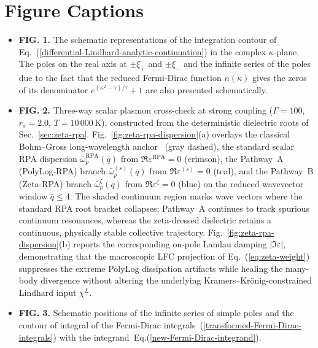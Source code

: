 \documentclass[aps,showkeys,noshowpacs,superscriptaddress,pre,preprint]{revtex4-2}
\begin{document}
\clearpage
\section*{Figure Captions}
\begin{itemize}
    \item \textbf{FIG. 1.} The schematic representations of
    the integration contour of Eq.~(\ref{differential-Lindhard-analytic-continuation})
    in the complex $\kappa$-plane.
    The poles on the real axis at $\pm \xi_{+}$ and $\pm \xi_{-}$
    and the infinite series of the poles due to the fact that
    the reduced Fermi-Dirac function ${n ( \kappa )} $
    gives the zeros of its denominator $e^{\left( \kappa^2 - \gamma \right) / \tau} + 1$
    are also presented schematically.

    \item \textbf{FIG. 2.} Three-way scalar plasmon cross-check at strong coupling ($\Gamma = 100$, $r_s = 2.0$, $T = 10\,000\,\mathrm{K}$), constructed from the deterministic dielectric roots of Sec.~\ref{sec:zeta-rpa}.
    Fig.~\ref{fig:zeta-rpa-dispersion}(a) overlays the classical Bohm--Gross long-wavelength anchor~\cite{Bohm-Gross1949} (gray dashed), the standard scalar RPA dispersion $\bar{\omega}_p^{\mathrm{RPA}}(\bar{q})$ from $\Re\varepsilon^{\mathrm{RPA}}=0$ (crimson), the Pathway~A (PolyLog-RPA) branch $\bar{\omega}_p^{(s)}(\bar{q})$ from $\Re\varepsilon^{(s)}=0$ (teal), and the Pathway~B (Zeta-RPA) branch $\bar{\omega}_p^{\zeta}(\bar{q})$ from $\Re\varepsilon^{\zeta}=0$ (blue) on the reduced wavevector window $\bar{q}\le 4$.
    The shaded continuum region marks wave vectors where the standard RPA root bracket collapses; Pathway~A continues to track spurious continuum resonances, whereas the zeta-dressed dielectric retains a continuous, physically stable collective trajectory.
    Fig.~\ref{fig:zeta-rpa-dispersion}(b) reports the corresponding on-pole Landau damping $|\Im\varepsilon|$, demonstrating that the macroscopic LFC projection of Eq.~(\ref{eq:zeta-weight}) suppresses the extreme PolyLog dissipation artifacts while healing the many-body divergence without altering the underlying Kramers--Kr\"onig-constrained Lindhard input $\chi^L$.

    \item \textbf{FIG. 3.} Schematic positions of the infinite series of simple poles
    and the contour of integral of the Fermi-Dirac integrals~(\ref{transformed-Fermi-Dirac-integrals})
    with the integrand~Eq.(\ref{new-Fermi-Dirac-integrand}).


\end{itemize}
\end{document}
